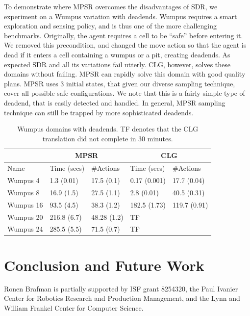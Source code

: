 \documentclass[letterpaper]{article}
\numberwithin{equation}{section}	%
\begin{document}
To demonstrate where MPSR overcomes the disadvantages of SDR, we experiment on a Wumpus variation with deadends.
Wumpus requires a smart exploration and sensing policy, and is thus one of the more challenging benchmarks. Originally, the agent requires a cell to be ``safe'' before entering it. We removed this precondition, and changed the move action so that the agent is dead if it enters a cell containing a wumpus or a pit, creating deadends. As expected SDR and all its variations fail utterly. CLG, however, solves these domains without failing. MPSR can rapidly solve this domain with good quality plans. MPSR uses 3 initial states, that given our diverse sampling technique, cover all possible safe configurations. We note that this is a fairly simple type of deadend, that is easily detected and handled. In general, MPSR sampling technique can still be trapped by more sophisticated deadends.


\begin{table}[htb]
\centering
\caption{
Wumpus domains with deadends. TF denotes that the CLG translation did not complete in 30 minutes.}
\scriptsize
\begin{tabular}{|l||l|l||l|l|}
\hline
	&  \multicolumn{2}{c||}{MPSR} &	\multicolumn{2}{c|}{CLG}	\\ \hline
Name & Time (secs) & \#Actions&  Time (secs) & \#Actions \\
\hline
Wumpus 4 & 1.3 (0.01)& 17.5 (0.1) & 0.17 (0.001) & 17.7 (0.04) \\
Wumpus 8 & 16.9 (1.5)& 27.5 (1.1) & 2.8 (0.01) & 40.5 (0.31) \\
Wumpus 16 &93.5 (4.5) &38.3 (1.2) &  182.5 (1.73) & 119.7 (0.91) \\
Wumpus 20 &216.8 (6.7) &48.28 (1.2) & TF & \\
Wumpus 24 &285.5 (5.5) &71.5 (0.7) &  TF &  \\
\hline
\end{tabular}
\label{tbl:Deadends}
\end{table}




\section{Conclusion and Future Work}




 Ronen Brafman is partially supported by ISF grant 8254320, the Paul Ivanier Center for Robotics Research and Production Management, and the Lynn and William Frankel Center for Computer Science.

\end{document}

